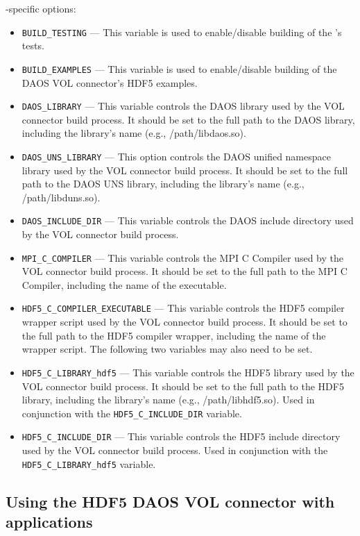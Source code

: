 \documentclass[../users_guide.tex]{subfiles}
\begin{document}
\dvc{}-specific options:

\begin{itemize}
  \item \texttt{BUILD\_TESTING} --- This variable is used to enable/disable building of the \dvc{}'s tests.
  \item \texttt{BUILD\_EXAMPLES} --- This variable is used to enable/disable building of the DAOS VOL connector's HDF5 examples.
  \item \texttt{DAOS\_LIBRARY} --- This variable controls the DAOS library used by the VOL connector build process. It should be set to the full path to the DAOS library, including the library's name (e.g., /path/libdaos.so).
  \item \texttt{DAOS\_UNS\_LIBRARY} --- This option controls the DAOS unified namespace library
  used by the VOL connector build process. It should be set to the full path to
  the DAOS UNS library, including the library's name (e.g., /path/libduns.so).
  \item \texttt{DAOS\_INCLUDE\_DIR} --- This variable controls the DAOS include directory used by the VOL connector build process.
  \item \texttt{MPI\_C\_COMPILER} --- This variable controls the MPI C Compiler used by the VOL connector build process. It should be set to the full path to the MPI C Compiler, including the name of the executable.
  \item \texttt{HDF5\_C\_COMPILER\_EXECUTABLE} --- This variable controls the HDF5 compiler wrapper script used by the VOL connector build process. It should be set to the full path to the HDF5 compiler wrapper, including the name of the wrapper script. The following two variables may also need to be set.
  \item \texttt{HDF5\_C\_LIBRARY\_hdf5} --- This variable controls the HDF5 library used by the VOL connector build process. It should be set to the full path to the HDF5 library, including the library's name (e.g., /path/libhdf5.so). Used in conjunction with the \texttt{HDF5\_C\_INCLUDE\_DIR} variable.
  \item \texttt{HDF5\_C\_INCLUDE\_DIR} --- This variable controls the HDF5 include directory used by the VOL connector build process. Used in conjunction with the \texttt{HDF5\_C\_LIBRARY\_hdf5} variable.
\end{itemize}

\subsection{Using the HDF5 DAOS VOL connector with applications}
\end{document}
